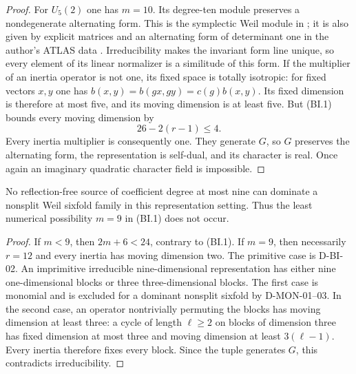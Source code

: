 \begin{proof}
For $U_5(2)$ one has $m=10$.  Its degree-ten module preserves a
nondegenerate alternating form.  This is the symplectic Weil module
in \cite[Table~II, author version p.~7; Proposition~7.10]{BI:GT}; it is also
given by explicit matrices and an alternating form of determinant
one in the author's ATLAS data \cite{BI:AtlasU52}.
Irreducibility makes the invariant form line unique, so every
element of its linear normalizer is a similitude of this form.
If the multiplier of an inertia operator is not one, its fixed
space is totally isotropic: for fixed vectors $x,y$ one has
$b(x,y)=b(gx,gy)=c(g)b(x,y)$.
Its fixed dimension is therefore at most five, and its moving
dimension is at least five.  But (BI.1) bounds every moving
dimension by
\[
              26-2(r-1)\le4.
\]
Every inertia multiplier is consequently one.  They generate $G$,
so $G$ preserves the alternating form, the representation is
self-dual, and its character is real.  Once again an imaginary
quadratic character field is impossible.
\end{proof}

\begin{proposition}
\label{D-BI-03}
No reflection-free source of coefficient degree at most nine can
dominate a nonsplit Weil sixfold family in this representation
setting.  Thus the least numerical possibility $m=9$ in (BI.1)
does not occur.
\end{proposition}
\begin{proof}
If $m<9$, then $2m+6<24$, contrary to (BI.1).  If $m=9$, then
necessarily $r=12$ and every inertia has moving dimension two.
The primitive case is D-BI-02.  An imprimitive irreducible
nine-dimensional representation has either nine one-dimensional
blocks or three three-dimensional blocks.  The first case is
monomial and is excluded for a dominant nonsplit sixfold by
D-MON-01--03.  In the second case, an operator nontrivially
permuting the blocks has moving dimension at least three: a
cycle of length $\ell\ge2$ on blocks of dimension three has
fixed dimension at most three and moving dimension at least
$3(\ell-1)$.  Every inertia therefore fixes every block.
Since the tuple generates $G$, this contradicts irreducibility.
\end{proof}

